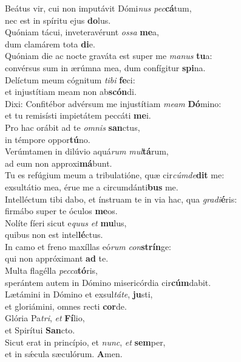 \evenverse Beátus vir, cui non imputávit Dómi\textit{nus} \textit{pec}\textbf{cá}tum,~\*\\
\evenverse nec est in spíritu ejus \textbf{do}lus.\\
\oddverse Quóniam tácui, inveteravérunt \textit{os}\textit{sa} \textbf{me}a,~\*\\
\oddverse dum clamárem tota \textbf{di}e.\\
\evenverse Quóniam die ac nocte graváta est super me \textit{ma}\textit{nus} \textbf{tu}a:~\*\\
\evenverse convérsus sum in ærúmna mea, dum confígitur \textbf{spi}na.\\
\oddverse Delíctum meum cógnitum \textit{ti}\textit{bi} \textbf{fe}ci:~\*\\
\oddverse et injustítiam meam non ab\textbf{scón}di.\\
\evenverse Dixi: Confitébor advérsum me injustítiam \textit{me}\textit{am} \textbf{Dó}mino:~\*\\
\evenverse et tu remisísti impietátem peccáti \textbf{me}i.\\
\oddverse Pro hac orábit ad te \textit{om}\textit{nis} \textbf{san}ctus,~\*\\
\oddverse in témpore oppor\textbf{tú}no.\\
\evenverse Verúmtamen in dilúvio aquá\textit{rum} \textit{mul}\textbf{tá}rum,~\*\\
\evenverse ad eum non approxi\textbf{má}bunt.\\
\oddverse Tu es refúgium meum a tribulatióne, quæ cir\textit{cúm}\textit{de}\textbf{dit} me:~\*\\
\oddverse exsultátio mea, érue me a circumdánti\textbf{bus} me.\\
\evenverse Intelléctum tibi dabo, et ínstruam te in via hac, qua \textit{gra}\textit{di}\textbf{é}ris:~\*\\
\evenverse firmábo super te óculos \textbf{me}os.\\
\oddverse Nolíte fíeri sicut e\textit{quus} \textit{et} \textbf{mu}lus,~\*\\
\oddverse quibus non est intel\textbf{lé}ctus.\\
\evenverse In camo et freno maxíllas eó\textit{rum} \textit{con}\textbf{strín}ge:~\*\\
\evenverse qui non appróximant \textbf{ad} te.\\
\oddverse Multa flagélla \textit{pec}\textit{ca}\textbf{tó}ris,~\*\\
\oddverse sperántem autem in Dómino misericórdia cir\textbf{cúm}dabit.\\
\evenverse Lætámini in Dómino et exsul\textit{tá}\textit{te}, \textbf{ju}sti,~\*\\
\evenverse et gloriámini, omnes recti \textbf{cor}de.\\
\oddverse Glória Pa\textit{tri}, \textit{et} \textbf{Fí}lio,~\*\\
\oddverse et Spirítui \textbf{San}cto.\\
\evenverse Sicut erat in princípio, et \textit{nunc}, \textit{et} \textbf{sem}per,~\*\\
\evenverse et in sǽcula sæculórum. \textbf{A}men.\\
